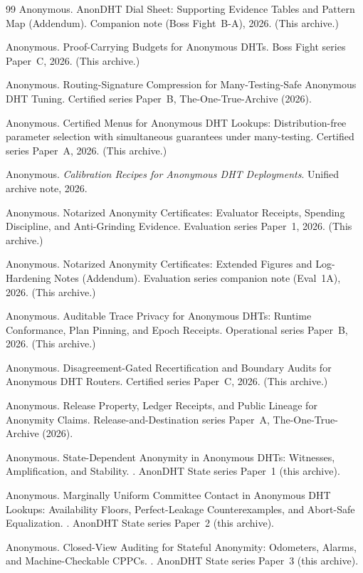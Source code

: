\documentclass[11pt]{article}
\begin{document}
\begin{thebibliography}{99}
Anonymous.
\newblock AnonDHT Dial Sheet: Supporting Evidence Tables and Pattern Map (Addendum).
\newblock Companion note (Boss Fight~B-A), 2026. (This archive.)

Anonymous.
\newblock Proof-Carrying Budgets for Anonymous DHTs.
\newblock Boss Fight series Paper~C, 2026. (This archive.)

Anonymous.
\newblock Routing-Signature Compression for Many-Testing-Safe Anonymous DHT Tuning.
\newblock Certified series Paper~B, The-One-True-Archive (2026).

Anonymous.
\newblock Certified Menus for Anonymous DHT Lookups: Distribution-free parameter selection with simultaneous guarantees under many-testing.
\newblock Certified series Paper~A, 2026. (This archive.)

Anonymous.
\newblock \emph{Calibration Recipes for Anonymous DHT Deployments}.
\newblock Unified archive note, 2026.

Anonymous.
\newblock Notarized Anonymity Certificates: Evaluator Receipts, Spending Discipline, and Anti-Grinding Evidence.
\newblock Evaluation series Paper~1, 2026. (This archive.)

Anonymous.
\newblock Notarized Anonymity Certificates: Extended Figures and Log-Hardening Notes (Addendum).
\newblock Evaluation series companion note (Eval~1A), 2026. (This archive.)

Anonymous.
\newblock Auditable Trace Privacy for Anonymous DHTs: Runtime Conformance, Plan Pinning, and Epoch Receipts.
\newblock Operational series Paper~B, 2026. (This archive.)

Anonymous.
\newblock Disagreement-Gated Recertification and Boundary Audits for Anonymous DHT Routers.
\newblock Certified series Paper~C, 2026. (This archive.)

Anonymous.
\newblock Release Property, Ledger Receipts, and Public Lineage for Anonymity Claims.
\newblock Release-and-Destination series Paper~A, The-One-True-Archive (2026).

Anonymous.
\newblock State-Dependent Anonymity in Anonymous DHTs: Witnesses, Amplification, and Stability.
.
\newblock AnonDHT State series Paper~1 (this archive).

Anonymous.
\newblock Marginally Uniform Committee Contact in Anonymous DHT Lookups: Availability Floors, Perfect-Leakage Counterexamples, and Abort-Safe Equalization.
.
\newblock AnonDHT State series Paper~2 (this archive).

Anonymous.
\newblock Closed-View Auditing for Stateful Anonymity: Odometers, Alarms, and Machine-Checkable CPPCs.
.
\newblock AnonDHT State series Paper~3 (this archive).

\end{thebibliography}
\end{document}
